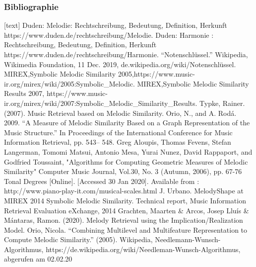 \documentclass{beamer}
\begin{document}
	\begin{frame}[allowframebreaks]
		\frametitle{Bibliographie}
		\begin{thebibliography}{5}
			[text]
			 Duden: Melodie: Rechtschreibung, Bedeutung, Definition, Herkunft
			https://www.duden.de/rechtschreibung/Melodie.
			 Duden: Harmonie : Rechtschreibung, Bedeutung, Definition, Herkunft
			https://www.duden.de/rechtschreibung/Harmonie.
			 “Notenschlüssel.” Wikipedia, Wikimedia Foundation, 11 Dec. 2019, de.wikipedia.org/wiki/Notenschlüssel.
			 MIREX,Symbolic Melodic Similarity 2005,https://www.music-ir.org/mirex/wiki/2005:Symbolic\_Melodic.
			 MIREX,Symbolic Melodic Similarity Results 2007, https://www.music-ir.org/mirex/wiki/2007:Symbolic\_Melodic\_Similarity\_Results.
			 Typke, Rainer. (2007). Music Retrieval based on Melodic Similarity.
			 Orio, N., and A. Rodá. 2009. “A Measure of Melodic Similarity Based on a Graph Representation of the Music Structure.” In Proceedings of the International Conference for Music Information Retrieval, pp. 543– 548.
			 Greg Aloupis, Thomas Fevens, Stefan Langerman, Tomomi Matsui, Antonio Mesa, Yurai Nunez, David Rappaport, and Godfried Toussaint, "Algorithms for Computing Geometric Measures of Melodic Similarity" Computer Music Journal, Vol.30, No. 3 (Autumn, 2006), pp. 67-76
			 Tonal Degrees [Online]. [Accessed 30 Jan 2020]. Available from : http://www.piano-play-it.com/musical-scales.html
			 J. Urbano. MelodyShape at MIREX 2014 Symbolic
            Melodic Similarity. Technical report, Music Information Retrieval Evaluation eXchange, 2014
             Grachten, Maarten \& Arcos, Josep Lluís \& Mántaras, Ramon. (2020). Melody Retrieval using the Implication/Realization Model. 
           	 Orio, Nicola. “Combining Multilevel and Multifeature Representation to Compute Melodic Similarity.” (2005).
           	 Wikipedia, Needlemann-Wunsch-Algorithmus, https://de.wikipedia.org/wiki/Needleman-Wunsch-Algorithmus, abgerufen am 02.02.20
		\end{thebibliography}
	\end{frame}
\end{document}
